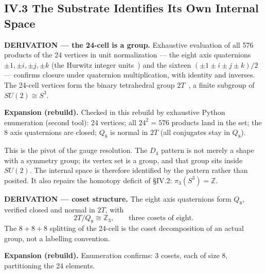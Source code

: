 \documentclass[11pt,a4paper]{article}
\newcommand{\expansion}[1]{\par\smallskip\noindent\textbf{Expansion (rebuild).} #1\par\smallskip}
\begin{document}
\subsection{IV.3 The Substrate Identifies Its Own Internal Space}
\textbf{DERIVATION --- the 24-cell is a group.} Exhaustive evaluation of all 576 products of the 24 vertices in unit normalization --- the eight axis quaternions $\pm1, \pm i, \pm j, \pm k$ (the Hurwitz integer units~\cite{hurwitz1896}) and the sixteen $(\pm1 \pm i \pm j \pm k)/2$ --- confirms closure under quaternion multiplication, with identity and inverses. The 24-cell vertices form the binary tetrahedral group $2T$~\cite{coxeter1957}, a finite subgroup of $SU(2) \cong S^3$.
\expansion{Checked in this rebuild by exhaustive Python enumeration (second tool): 24 vertices; all $24^2 = 576$ products land in the set; the 8 axis quaternions are closed; $Q_8$ is normal in $2T$ (all conjugates stay in $Q_8$).}
This is the pivot of the gauge resolution. The $D_4$ pattern is not merely a shape with a symmetry group; its vertex set is a group, and that group sits inside $SU(2)$. The internal space is therefore identified by the pattern rather than posited. It also repairs the homotopy deficit of \S IV.2: $\pi_3(S^3) = \mathbb{Z}$.

\textbf{DERIVATION --- coset structure.} The eight axis quaternions form $Q_8$, verified closed and normal in $2T$, with
\begin{equation}
2T/Q_8 \cong \mathbb{Z}_3, \qquad \text{three cosets of eight}.
\end{equation}
The $8+8+8$ splitting of the 24-cell is the coset decomposition of an actual group, not a labelling convention.
\expansion{Enumeration confirms: 3 cosets, each of size 8, partitioning the 24 elements.}
\end{document}
